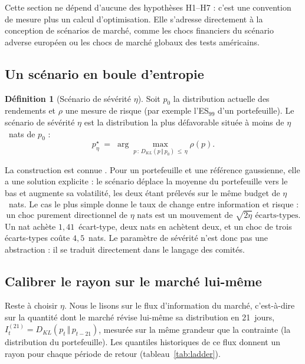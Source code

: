 \documentclass[11pt]{article}
\theoremstyle{definition}
\newtheorem{definition}{Définition}
\newcommand{\KL}[2]{D_{KL}\!\left(#1\,\Vert\,#2\right)}
\begin{document}
Cette section ne dépend d'aucune des hypothèses H1--H7 : c'est une convention
de mesure plus un calcul d'optimisation. Elle s'adresse directement à la
conception de scénarios de marché, comme les chocs financiers du scénario
adverse européen ou les chocs de marché globaux des tests américains.

\subsection{Un scénario en boule d'entropie}

\begin{definition}[Scénario de sévérité $\eta$]
Soit $p_0$ la distribution actuelle des rendements et $\rho$ une mesure de
risque (par exemple l'ES$_{99}$ d'un portefeuille). Le scénario de sévérité
$\eta$ est la distribution la plus défavorable située à moins de $\eta$~nats
de $p_0$ :
\begin{equation}
\label{eq:ball}
p^\star_\eta \;=\; \arg\max_{p\,:\,\KL{p}{p_0}\,\le\,\eta} \rho(p).
\end{equation}
\end{definition}

La construction est connue \citep{breuer2013,glasserman2014}. Pour un
portefeuille et une référence gaussienne, elle a une solution explicite : le
scénario déplace la moyenne du portefeuille vers le bas et augmente sa
volatilité, les deux étant prélevés sur le même budget de $\eta$~nats. Le cas
le plus simple donne le taux de change entre information et risque :
\begin{equation}
\text{un choc purement directionnel de }\eta\text{ nats est un mouvement de }\sqrt{2\eta}\text{ écarts-types.}
\end{equation}
Un nat achète $1{,}41$~écart-type, deux nats en achètent deux, et un choc de
trois écarts-types coûte $4{,}5$~nats. Le paramètre de sévérité n'est donc pas
une abstraction : il se traduit directement dans le langage des comités.

\subsection{Calibrer le rayon sur le marché lui-même}

Reste à choisir $\eta$. Nous le lisons sur le flux d'information du marché,
c'est-à-dire sur la quantité dont le marché révise lui-même sa distribution en
21~jours, $I^{(21)}_t=\KL{p_t}{p_{t-21}}$, mesurée sur la même grandeur que la
contrainte (la distribution du portefeuille). Les quantiles historiques de ce
flux donnent un rayon pour chaque période de retour
(tableau~\ref{tab:ladder}).
\end{document}
